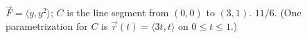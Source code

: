{$\vec F = \langle y, y^2\rangle$; $C$ is the line segment from $(0,0)$ to $(3,1)$.
}
{$11/6$. (One parametrization for $C$ is $\vec r(t) = \langle 3t,t\rangle$ on $0\leq t\leq 1$.)
}
